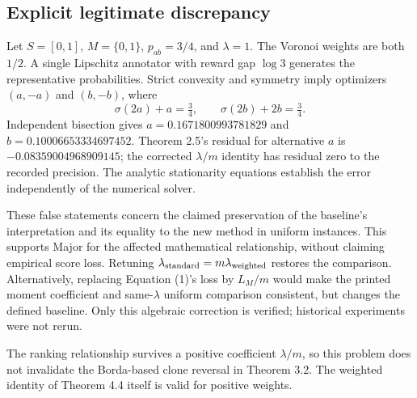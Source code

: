 \documentclass[10pt]{article}
\begin{document}
\subsection*{Explicit legitimate discrepancy}
Let \(S=[0,1]\), \(M=\{0,1\}\), \(p_{ab}=3/4\), and \(\lambda=1\). The Voronoi weights are both \(1/2\). A single Lipschitz annotator with reward gap \(\log3\) generates the representative probabilities. Strict convexity and symmetry imply optimizers \((a,-a)\) and \((b,-b)\), where \[\sigma(2a)+a=\tfrac34,\qquad
 \sigma(2b)+2b=\tfrac34.\] Independent bisection gives \(a=0.1671800993781829\) and \(b=0.10006653334697452\). Theorem 2.5’s residual for alternative \(a\) is \(-0.08359004968909145\); the corrected \(\lambda/m\) identity has residual zero to the recorded precision. The analytic stationarity equations establish the error independently of the numerical solver.\par
These false statements concern the claimed preservation of the baseline’s interpretation and its equality to the new method in uniform instances. This supports Major for the affected mathematical relationship, without claiming empirical score loss. Retuning \(\lambda_{\rm standard}=m\lambda_{\rm weighted}\) restores the comparison. Alternatively, replacing Equation (1)’s loss by \(L_M/m\) would make the printed moment coefficient and same-\(\lambda\) uniform comparison consistent, but changes the defined baseline. Only this algebraic correction is verified; historical experiments were not rerun.\par
The ranking relationship survives a positive coefficient \(\lambda/m\), so this problem does not invalidate the Borda-based clone reversal in Theorem 3.2. The weighted identity of Theorem 4.4 itself is valid for positive weights.\par
\end{document}
